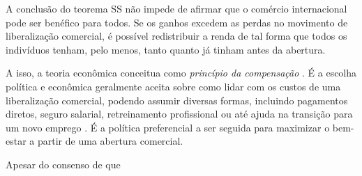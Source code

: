 A conclusão do teorema SS não impede de afirmar que o comércio internacional pode ser benéfico para todos. Se os ganhos excedem as perdas no movimento de liberalização comercial, é possível redistribuir a renda de tal forma que todos os indivíduos tenham, pelo menos, tanto quanto já tinham antes da abertura.

A isso, a teoria econômica conceitua como \textit{princípio da compensação} \cite{irwin98}. É a escolha política e econômica geralmente aceita sobre como lidar com os custos de uma liberalização comercial, podendo assumir diversas formas, incluindo pagamentos diretos, seguro salarial, retreinamento profissional ou até ajuda na transição para um novo emprego \cite{kolben21}. É a política preferencial a ser seguida para maximizar o bem-estar a partir de uma abertura comercial.

Apesar do consenso de que


